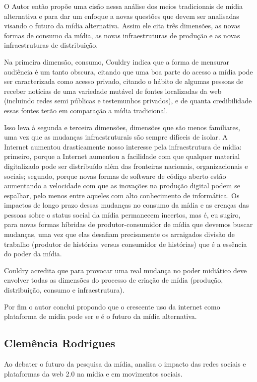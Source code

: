 O Autor então propõe uma cisão nessa análise dos meios tradicionais de mídia alternativa e para dar um enfoque a novas questões que devem ser analisadas visando o futuro da mídia alternativa. Assim ele cita três dimensões, as novas formas de consumo da mídia, as novas infraestruturas de produção e as novas infraestruturas de distribuição.  

Na primeira dimensão, consumo, Couldry indica que a forma de mensurar audiência é um tanto obscura, citando que uma boa parte do acesso a mídia pode ser caracterizada como acesso privado, citando o hábito de algumas pessoas de receber notícias de uma variedade mutável de fontes localizadas da web (incluindo redes semi públicas e testemunhos privados), e de quanta credibilidade essas fontes terão em comparação a mídia tradicional.

Isso leva à segunda e terceira dimensões, dimensões que são menos familiares, uma vez que as mudanças infraestruturais são sempre difíceis de isolar. A Internet aumentou drasticamente nosso interesse pela infraestrutura de mídia: primeiro, porque a Internet aumentou a facilidade com que qualquer material digitalizado pode ser distribuído além das fronteiras nacionais, organizacionais e sociais; segundo, porque novas formas de software de código aberto estão aumentando a velocidade com que as inovações na produção digital podem se espalhar, pelo menos entre aqueles com alto conhecimento de informática. Os impactos de longo prazo dessas mudanças no consumo da mídia e as crenças das pessoas sobre o status social da mídia permanecem incertos, mas é, eu sugiro, para novas formas híbridas de produtor-consumidor de mídia que devemos buscar mudanças, uma vez que elas desafiam precisamente os arraigados divisão de trabalho (produtor de histórias versus consumidor de histórias) que é a essência do poder da mídia.

Couldry acredita que para provocar uma real mudança no poder midiático deve envolver todas as dimensões do processo de criação de mídia (produção, distribuição, consumo e infraestrutura).

Por fim o autor conclui propondo que o crescente uso da internet como plataforma de mídia pode ser e é o futuro da mídia alternativa.
\subsection{Clemência Rodrigues}
Ao debater o futuro da pesquisa da mídia, analisa o impacto das redes sociais e plataformas da web 2.0 na mídia e em movimentos sociais.


